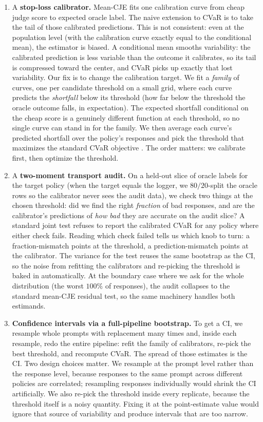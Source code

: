 \begin{enumerate}[leftmargin=*,nosep]
\item A \textbf{stop-loss calibrator.} Mean-CJE fits one calibration
curve from cheap judge score to expected oracle label. The naive
extension to CVaR is to take the tail of those calibrated predictions.
This is not consistent: even at the population level (with the
calibration curve exactly equal to the conditional mean), the
estimator is biased. A conditional mean smooths variability: the
calibrated prediction is less variable than the outcome it calibrates,
so its tail is compressed toward the center, and CVaR picks up exactly
that lost variability. Our fix is to change the calibration target.
We fit a \emph{family} of curves, one per candidate threshold on a
small grid, where each curve predicts the \emph{shortfall} below its
threshold (how far below the threshold the oracle outcome falls, in
expectation). The expected shortfall conditional on the cheap score
is a genuinely different function at each threshold, so no single
curve can stand in for the family. We then average each curve's
predicted shortfall over the policy's responses and pick the
threshold that maximizes the standard CVaR objective
\citep{RockafellarUryasev2000}. The order matters: we calibrate
first, then optimize the threshold.

\item A \textbf{two-moment transport audit.} On a held-out slice of
oracle labels for the target policy (when the target equals the
logger, we $80/20$-split the oracle rows so the calibrator never sees
the audit data), we check two things at the chosen threshold: did we
find the right \emph{fraction} of bad responses, and are the
calibrator's predictions of \emph{how bad} they are accurate on the
audit slice? A standard joint test refuses to report the calibrated
CVaR for any policy where either check fails. Reading which check
failed tells us which knob to turn: a fraction-mismatch points at the
threshold, a prediction-mismatch points at the calibrator. The
variance for the test reuses the same bootstrap as the CI, so the
noise from refitting the calibrators and re-picking the threshold is
baked in automatically. At the boundary case where we ask for the
whole distribution (the worst $100\%$ of responses), the audit
collapses to the standard mean-CJE residual test, so the same
machinery handles both estimands.

\item \textbf{Confidence intervals via a full-pipeline bootstrap.} To
get a CI, we resample whole prompts with replacement many times and,
inside each resample, redo the entire pipeline: refit the family of
calibrators, re-pick the best threshold, and recompute CVaR. The
spread of those estimates is the CI. Two design choices matter. We
resample at the prompt level rather than the response level, because
responses to the same prompt across different policies are
correlated; resampling responses individually would shrink the CI
artificially. We also re-pick the threshold inside every replicate,
because the threshold itself is a noisy quantity. Fixing it at the
point-estimate value would ignore that source of variability and
produce intervals that are too narrow.
\end{enumerate}

